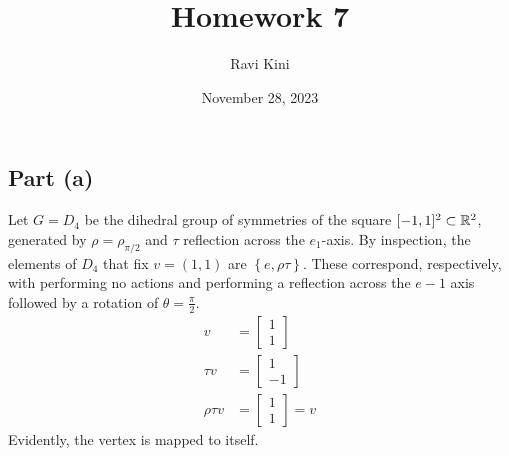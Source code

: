 \documentclass{article}
\title{Homework 7}
\author{Ravi Kini}
\date{November 28, 2023}
\begin{document}
\maketitle

\subsection*{Part (a)}
Let $G = D_4$ be the dihedral group of symmetries of the square $[-1,1]^2 \subset \mathbb{R}^2$, generated by $\rho = \rho_{\pi/2}$ and $\tau$ reflection across the $e_1$-axis. By inspection, the elements of $D_4$ that fix $v = \left(1, 1\right)$ are $\left\{e, \rho\tau\right\}$. These correspond, respectively, with performing no actions and performing a reflection across the $e-1$ axis followed by a rotation of $\theta = \frac{\pi}{2}$.
\begin{equation}
    \begin{split}
        v & = \begin{bmatrix} 1 \\ 1 \end{bmatrix} \\
        \tau v & = \begin{bmatrix} 1 \\ -1 \end{bmatrix} \\
        \rho\tau v & = \begin{bmatrix} 1 \\ 1 \end{bmatrix} =  v
    \end{split}
\end{equation}
Evidently, the vertex is mapped to itself.
\end{document}
